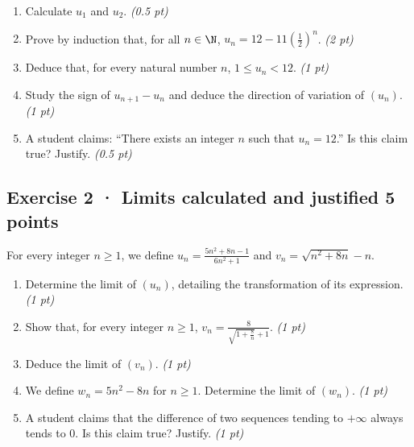 \begin{enumerate}

\item Calculate $u_1$ and $u_2$. \hfill\textit{(0.5 pt)}

\item Prove by induction that, for all $n\in\N$, $u_n=12-11\left(\frac{1}{2}\right)^n$. \hfill\textit{(2 pt)}

\item Deduce that, for every natural number $n$, $1\le u_n<12$. \hfill\textit{(1 pt)}

\item Study the sign of $u_{n+1}-u_n$ and deduce the direction of variation of $(u_n)$. \hfill\textit{(1 pt)}

\item A student claims: ``There exists an integer $n$ such that $u_n=12$.'' Is this claim true? Justify. \hfill\textit{(0.5 pt)}

\end{enumerate}

\subsection*{Exercise 2 · Limits calculated and justified \hfill 5 points}For every integer $n\ge1$, we define $u_n=\frac{5n^2+8n-1}{6n^2+1}$ and $v_n=\sqrt{n^2+8n}-n$.

\begin{enumerate}

\item Determine the limit of $(u_n)$, detailing the transformation of its expression. \hfill\textit{(1 pt)}

\item Show that, for every integer $n\ge1$, $v_n=\frac{8}{\sqrt{1+\frac{8}n}+1}$. \hfill\textit{(1 pt)}

\item Deduce the limit of $(v_n)$. \hfill\textit{(1 pt)}

\item We define $w_n=5n^2-8n$ for $n\ge1$. Determine the limit of $(w_n)$. \hfill\textit{(1 pt)}

\item A student claims that the difference of two sequences tending to $+\infty$ always tends to $0$. Is this claim true? Justify. \hfill\textit{(1 pt)}

\end{enumerate}

